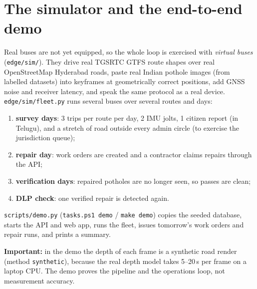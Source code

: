 \documentclass[11pt,a4paper]{article}
\newcommand{\code}[1]{\texttt{\small #1}}
\begin{document}
\section{The simulator and the end-to-end demo}\label{sec:demo}

Real buses are not yet equipped, so the whole loop is exercised with \emph{virtual buses}
(\code{edge/sim/}). They drive real TGSRTC GTFS route shapes over real OpenStreetMap Hyderabad roads, paste real
Indian pothole images (from labelled datasets) into keyframes at geometrically correct positions, add GNSS noise
and receiver latency, and speak the same protocol as a real device. \code{edge/sim/fleet.py} runs several buses
over several routes and days:
\begin{enumerate}
  \item \textbf{survey days}: 3 trips per route per day, 2 IMU jolts, 1 citizen report (in Telugu), and a stretch of
        road outside every admin circle (to exercise the jurisdiction queue);
  \item \textbf{repair day}: work orders are created and a contractor claims repairs through the API;
  \item \textbf{verification days}: repaired potholes are no longer seen, so passes are clean;
  \item \textbf{DLP check}: one verified repair is detected again.
\end{enumerate}
\code{scripts/demo.py} (\code{tasks.ps1 demo} / \code{make demo}) copies the seeded database, starts the API and web
app, runs the fleet, issues tomorrow's work orders and repair runs, and prints a summary.

\textbf{Important:} in the demo the depth of each frame is a synthetic road render (method \code{synthetic}),
because the real depth model takes 5--20\,s per frame on a laptop CPU. The demo proves the pipeline and the
operations loop, not measurement accuracy.
\end{document}
